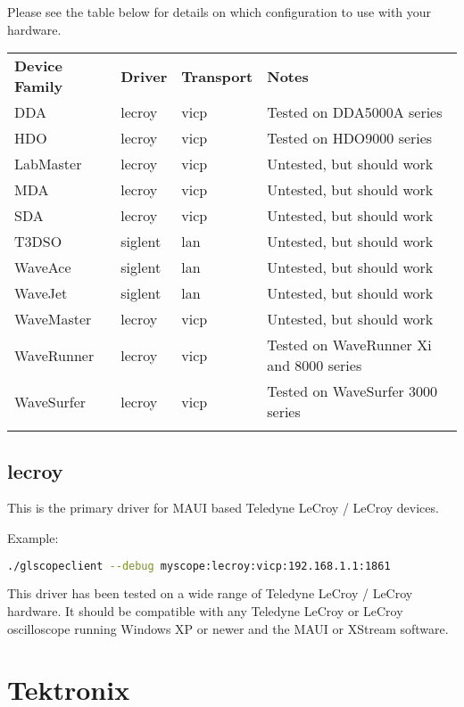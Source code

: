 Please see the table below for details on which configuration to use with  your hardware.

\begin{tabularx}{16cm}{lllX}
\thickhline
\textbf{Device Family} & \textbf{Driver} & \textbf{Transport} & \textbf{Notes} \\
\thickhline
DDA & lecroy & vicp & Tested on DDA5000A series \\
\thickhline
HDO & lecroy & vicp & Tested on HDO9000 series \\
\thickhline
LabMaster & lecroy & vicp & Untested, but should work\\
\thickhline
MDA & lecroy & vicp & Untested, but should work\\
\thickhline
SDA & lecroy & vicp & Untested, but should work\\
\thickhline
T3DSO & siglent & lan & Untested, but should work\\
\thickhline
WaveAce & siglent & lan & Untested, but should work \\
\thickhline
WaveJet & siglent & lan & Untested, but should work \\
\thickhline
WaveMaster & lecroy & vicp & Untested, but should work \\
\thickhline
WaveRunner & lecroy & vicp & Tested on WaveRunner Xi and 8000 series\\
\thickhline
WaveSurfer & lecroy & vicp & Tested on WaveSurfer 3000 series \\
\thickhline
\end{tabularx}

\subsection{lecroy}

This is the primary driver for MAUI based Teledyne LeCroy / LeCroy devices.

Example:
\begin{lstlisting}[language=sh]
./glscopeclient --debug myscope:lecroy:vicp:192.168.1.1:1861
\end{lstlisting}

This driver has been tested on a wide range of Teledyne LeCroy / LeCroy hardware. It should be compatible with any
Teledyne LeCroy or LeCroy oscilloscope running Windows XP or newer and the MAUI or XStream software.

\section{Tektronix}

